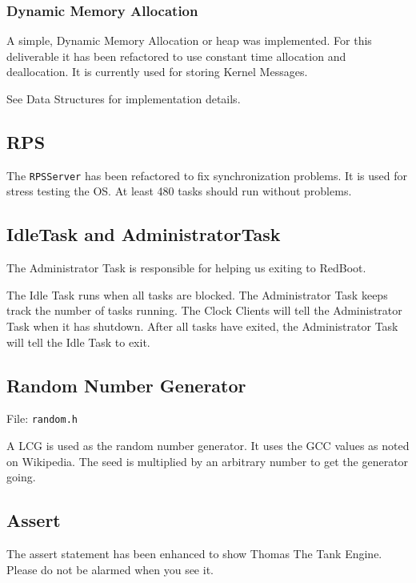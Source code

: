 \documentclass[letterpaper]{article}
\begin{document}
\subsubsection{Dynamic Memory Allocation%
  \label{dynamic-memory-allocation}%
}

A simple, Dynamic Memory Allocation or heap was implemented. For this deliverable it has been refactored to use constant time allocation and deallocation.  It is currently used for storing Kernel Messages.

See Data Structures for implementation details.


\subsection{RPS%
  \label{rps}%
}

The \texttt{RPSServer} has been refactored to fix synchronization problems. It is used for stress testing the OS. At least 480 tasks should run without problems.


\subsection{IdleTask and AdministratorTask%
  \label{id1}%
}

The Administrator Task is responsible for helping us exiting to RedBoot.

The Idle Task runs when all tasks are blocked. The Administrator Task keeps track the number of tasks running. The Clock Clients will tell the Administrator Task when it has shutdown. After all tasks have exited, the Administrator Task will tell the Idle Task to exit.


\subsection{Random Number Generator%
  \label{random-number-generator}%
}

File: \texttt{random.h}

A LCG is used as the random number generator. It uses the GCC values as noted on Wikipedia. The seed is multiplied by an arbitrary number to get the generator going.


\subsection{Assert%
  \label{assert}%
}

The assert statement has been enhanced to show Thomas The Tank Engine. Please do not be alarmed when you see it.
\end{document}
